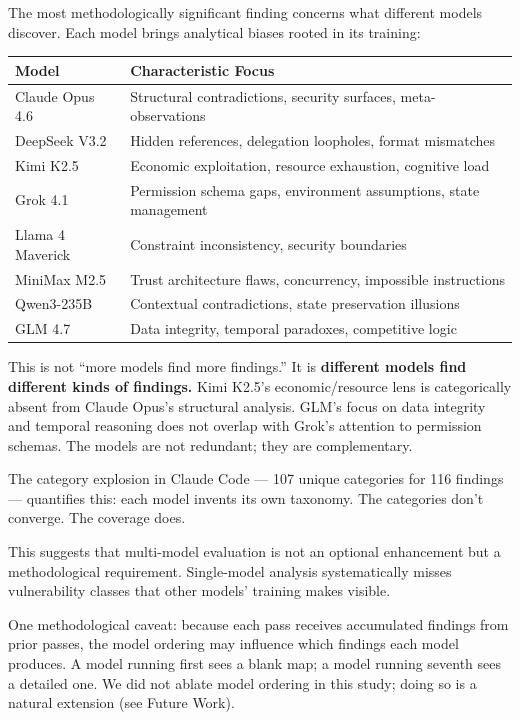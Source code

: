 The most methodologically significant finding concerns what different
models discover. Each model brings analytical biases rooted in its
training:

\begin{table}[t]
\small
\begin{tabular}{@{}lp{}@{}}
\toprule
Model & Characteristic Focus \\
\midrule
Claude Opus 4.6 & Structural contradictions, security surfaces, meta-observations \\
DeepSeek V3.2 & Hidden references, delegation loopholes, format mismatches \\
Kimi K2.5 & Economic exploitation, resource exhaustion, cognitive load \\
Grok 4.1 & Permission schema gaps, environment assumptions, state management \\
Llama 4 Maverick & Constraint inconsistency, security boundaries \\
MiniMax M2.5 & Trust architecture flaws, concurrency, impossible instructions \\
Qwen3-235B & Contextual contradictions, state preservation illusions \\
GLM 4.7 & Data integrity, temporal paradoxes, competitive logic \\
\bottomrule
\end{tabular}
\end{table}

This is not ``more models find more findings.'' It is \textbf{different
models find different kinds of findings.} Kimi K2.5's economic/resource
lens is categorically absent from Claude Opus's structural analysis.
GLM's focus on data integrity and temporal reasoning does not overlap
with Grok's attention to permission schemas. The models are not
redundant; they are complementary.

The category explosion in Claude Code --- 107 unique categories for 116
findings --- quantifies this: each model invents its own taxonomy. The
categories don't converge. The coverage does.

This suggests that multi-model evaluation is not an optional enhancement
but a methodological requirement. Single-model analysis systematically
misses vulnerability classes that other models' training makes visible.

One methodological caveat: because each pass receives accumulated
findings from prior passes, the model ordering may influence which
findings each model produces. A model running first sees a blank map; a
model running seventh sees a detailed one. We did not ablate model
ordering in this study; doing so is a natural extension (see Future
Work).

